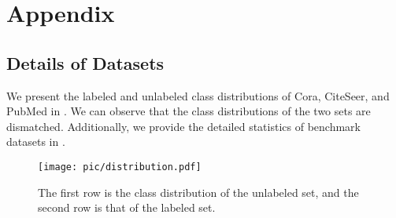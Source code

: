\section{Appendix}
\label{sec:app}

\subsection{Details of Datasets}
\label{app:datasets}

We present the labeled and unlabeled class distributions of Cora, CiteSeer, and PubMed in . We can observe that the class distributions of the two sets are dismatched. Additionally, we provide the detailed statistics of benchmark datasets in .


\begin{figure}[h]
\centering
\texttt{[image: pic/distribution.pdf]}
\caption{The first row is the class distribution of the unlabeled set, and the second row is that of the labeled set.}
\label{fig:distribution}
\end{figure}

\begin{table}[h]
\caption{Statistics of datasets}
\label{tab:sta}
\end{table}

